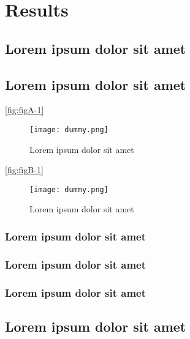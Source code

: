 \chapter{Results}

\section{Lorem ipsum dolor sit amet}

\lipsum[1-3]

\section{Lorem ipsum dolor sit amet}

\lipsum[1-1] \ref{fig:figA-1}

\begin{figure}[H]
    \centering
    \texttt{[image: dummy.png]}
    \caption{Lorem ipsum dolor sit amet}
    \label{fig:figA-4}
\end{figure}

\lipsum[1-1] \ref{fig:figB-1}

\begin{figure}[H]
    \centering
    \texttt{[image: dummy.png]}
    \caption{Lorem ipsum dolor sit amet}
    \label{fig:figB-4}
\end{figure}

\subsection{Lorem ipsum dolor sit amet}

\lipsum[1-1] \cite{reference-1}

\subsection{Lorem ipsum dolor sit amet}

\lipsum[1-1] \cite{reference-2}

\subsection{Lorem ipsum dolor sit amet}

\lipsum[1-1] \cite{reference-3}

\section{Lorem ipsum dolor sit amet}

